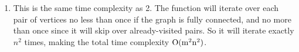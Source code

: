 \documentclass[11pt]{article}
\begin{document}
\begin{enumerate}
\item This is the same time complexity as 2. The function will iterate over each pair of vertices no less than
once if the graph is fully connected, and no more than once since it will skip over already-visited pairs.
So it will iterate exactly \(n^2\) times, making the total time complexity \(\rm O(m^2n^2)\).
\end{enumerate}
\end{document}

